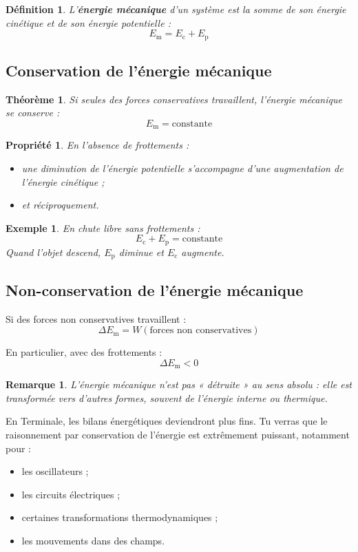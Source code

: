 \documentclass[11pt,a4paper]{article}
\newtheorem{definition}{Définition}[section]
\newtheorem{propriete}{Propriété}[section]
\newtheorem{theoreme}{Théorème}[section]
\newtheorem{remarque}{Remarque}[section]
\newtheorem{exemple}{Exemple}[section]
\newcommand{\Ec}{E_\mathrm{c}}
\newcommand{\Ep}{E_\mathrm{p}}
\newcommand{\Em}{E_\mathrm{m}}
\begin{document}
\begin{definition}
L'\textbf{énergie mécanique} d'un système est la somme de son énergie cinétique et de son énergie potentielle :
\[
\Em = \Ec + \Ep
\]
\end{definition}

\subsection{Conservation de l'énergie mécanique}

\begin{theoreme}
Si seules des forces conservatives travaillent, l'énergie mécanique se conserve :
\[
\Em = \text{constante}
\]
\end{theoreme}

\begin{propriete}
En l'absence de frottements :
\begin{itemize}
    \item une diminution de l'énergie potentielle s'accompagne d'une augmentation de l'énergie cinétique ;
    \item et réciproquement.
\end{itemize}
\end{propriete}

\begin{exemple}
En chute libre sans frottements :
\[
\Ec + \Ep = \text{constante}
\]
Quand l'objet descend, $\Ep$ diminue et $\Ec$ augmente.
\end{exemple}

\subsection{Non-conservation de l'énergie mécanique}

Si des forces non conservatives travaillent :
\[
\Delta \Em = W(\text{forces non conservatives})
\]

En particulier, avec des frottements :
\[
\Delta \Em <0
\]

\begin{remarque}
L'énergie mécanique n'est pas « détruite » au sens absolu : elle est transformée vers d'autres formes, souvent de l'énergie interne ou thermique.
\end{remarque}

\begin{terminalebox}
En Terminale, les bilans énergétiques deviendront plus fins.  
Tu verras que le raisonnement par conservation de l'énergie est extrêmement puissant, notamment pour :
\begin{itemize}
    \item les oscillateurs ;
    \item les circuits électriques ;
    \item certaines transformations thermodynamiques ;
    \item les mouvements dans des champs.
\end{itemize}
\end{terminalebox}
\end{document}
